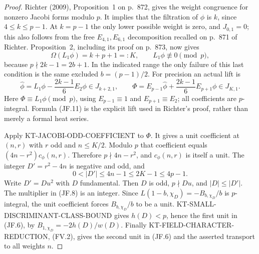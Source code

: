 \begin{proof}
Richter (2009), Proposition~1 on p.~872, gives the weight
congruence for nonzero Jacobi forms modulo $p$.
It implies that the filtration of $\phi$ is $k$, since
$4\leq k\leq p-1$.  At $k=p-1$ the only lower possible weight
is zero, and $J_{0,1}=0$; this also follows from the free
$E_{4,1},E_{6,1}$ decomposition recalled on p.~871 of Richter.
Proposition~2, including its proof on p.~873, now gives
\[
 \Omega(L_1\phi)=k+p+1=:K,\qquad L_1\phi\not\equiv0\pmod p,
                                                               \tag{JF.10}
\]
because $p\nmid 2k-1=2b+1$.  In the indicated range the only
failure of this last condition is the same excluded $b=(p-1)/2$.
For precision an actual lift is
\[
 \widehat\phi=L_1\phi-\frac{2k-1}{6}E_2\phi\in J_{k+2,1},
 \qquad
 \Phi=E_{p-1}\widehat\phi+
                   \frac{2k-1}{6}E_{p+1}\phi\in J_{K,1}.
                                                               \tag{JF.11}
\]
Here $\Phi\equiv L_1\phi\pmod p$, using
$E_{p-1}\equiv1$ and $E_{p+1}\equiv E_2$; all coefficients
are $p$-integral.  Formula (JF.11) is the explicit lift used in
Richter's proof, rather than merely a formal heat series.

Apply KT-JACOBI-ODD-COEFFICIENT to $\Phi$.  It gives a unit
coefficient at $(n,r)$ with $r$ odd and $n\leq K/2$.
Modulo $p$ that coefficient equals
$(4n-r^2)c_\phi(n,r)$.  Therefore $p\nmid4n-r^2$, and
$c_\phi(n,r)$ is itself a unit.  The integer
$D'=r^2-4n$ is negative and odd, and
\[
                    0<|D'|\leq4n-1\leq2K-1\leq4p-1.
                                                               \tag{JF.12}
\]
Write $D'=Du^2$ with $D$ fundamental.  Then $D$ is odd,
$p\nmid Du$, and $|D|\leq|D'|$.
The multiplier in (JF.8) is an integer.  Since
$L(1-b,\chi_D)=-B_{b,\chi_D}/b$ is $p$-integral,
the unit coefficient forces $B_{b,\chi_D}/b$ to be a unit.
KT-SMALL-DISCRIMINANT-CLASS-BOUND gives $h(D)<p$, hence the
first unit in (JF.6), by $B_{1,\chi_D}=-2h(D)/w(D)$.
Finally KT-FIELD-CHARACTER-REDUCTION, (FV.2), gives the second
unit in (JF.6) and the asserted transport to all weights $n$.
\end{proof}

